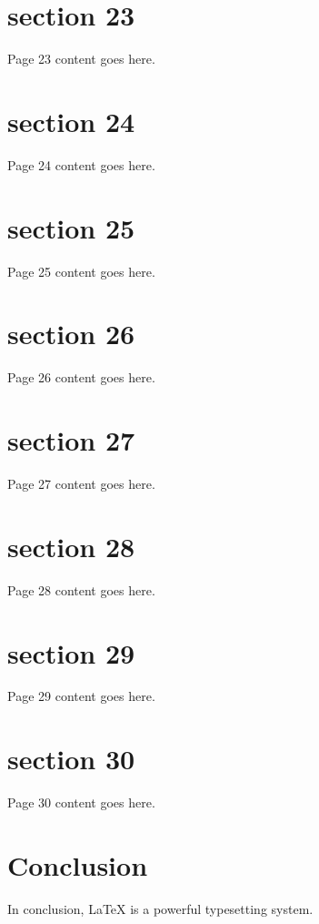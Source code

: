 \documentclass{article}
\begin{document}
\section{section 23}
Page 23 content goes here.
\newpage

\section{section 24}
Page 24 content goes here.
\newpage

\section{section 25}
Page 25 content goes here.
\newpage

\section{section 26}
Page 26 content goes here.
\newpage

\section{section 27}
Page 27 content goes here.
\newpage

\section{section 28}
Page 28 content goes here.
\newpage

\section{section 29}
Page 29 content goes here.
\newpage

\section{section 30}
Page 30 content goes here.
\newpage




\section{Conclusion}
In conclusion, LaTeX is a powerful typesetting system.

\end{document}
